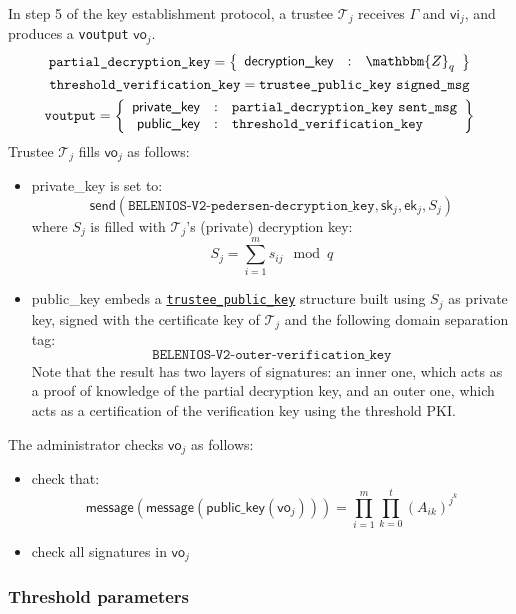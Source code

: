 \documentclass[a4paper]{article}
\newcommand{\dstprefix}{BELENIOS-V2}
\newcommand{\Z}{\mathbbm{Z}}
\begin{document}
In step 5 of the key establishment protocol, a trustee $\mathcal{T}_j$ receives
$\Gamma$ and $\textsf{vi}_j$, and produces a \texttt{voutput}
$\textsf{vo}_j$.
\begin{gather*}
  \texttt{partial\_decryption\_key}=\left\{
    \begin{array}{rcl}
      \textsf{decryption\_key}&:&\Z_q
    \end{array}
  \right\}\\
  \texttt{threshold\_verification\_key}=\texttt{trustee\_public\_key}\ \texttt{signed\_msg}\\
  \texttt{voutput}=\left\{
    \begin{array}{rcl}
      \textsf{private\_key}&:&\texttt{partial\_decryption\_key}\ \texttt{sent\_msg}\\
      \textsf{public\_key}&:&\texttt{threshold\_verification\_key}
    \end{array}
  \right\}
\end{gather*}
Trustee $\mathcal{T}_j$ fills $\textsf{vo}_j$ as follows:
\begin{itemize}
\item \textsf{private\_key} is set to:
  \[\textsf{send}(\texttt{\dstprefix-pedersen-decryption\_key},\textsf{sk}_j,\textsf{ek}_j,S_j)\]
  where $S_j$ is filled with $\mathcal{T}_j$'s (private) decryption
  key:
  \[
    S_j=\sum_{i=1}^m s_{ij}\mod q
  \]
\item \textsf{public\_key} embeds a
  \hyperref[trustee-keys]{\texttt{trustee\_public\_key}} structure
  built using $S_j$ as private key, signed with the certificate key of
  $\mathcal{T}_j$ and the following domain separation tag:
  \[\texttt{\dstprefix-outer-verification\_key}\]
  Note that the result has two layers of signatures: an inner one,
  which acts as a proof of knowledge of the partial decryption key,
  and an outer one, which acts as a certification of the verification
  key using the threshold PKI.
\end{itemize}
The administrator checks $\textsf{vo}_j$ as follows:
\begin{itemize}
\item check that:
  \[
    \textsf{message}(\textsf{message}(\textsf{public\_key}(\textsf{vo}_j)))=\prod_{i=1}^m \prod_{k=0}^t (A_{ik})^{j^k}
  \]
\item check all signatures in $\textsf{vo}_j$
\end{itemize}

\subsubsection{Threshold parameters}
\label{threshold-params}
\end{document}

